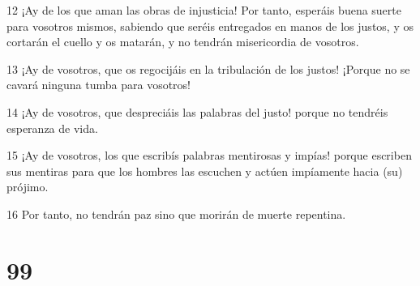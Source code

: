 \par 12 ¡Ay de los que aman las obras de injusticia! Por tanto, esperáis buena suerte para vosotros mismos, sabiendo que seréis entregados en manos de los justos, y os cortarán el cuello y os matarán, y no tendrán misericordia de vosotros.
\par 13 ¡Ay de vosotros, que os regocijáis en la tribulación de los justos! ¡Porque no se cavará ninguna tumba para vosotros!
\par 14 ¡Ay de vosotros, que despreciáis las palabras del justo! porque no tendréis esperanza de vida.
\par 15 ¡Ay de vosotros, los que escribís palabras mentirosas y impías! porque escriben sus mentiras para que los hombres las escuchen y actúen impíamente hacia (su) prójimo.
\par 16 Por tanto, no tendrán paz sino que morirán de muerte repentina.

\chapter{99}


